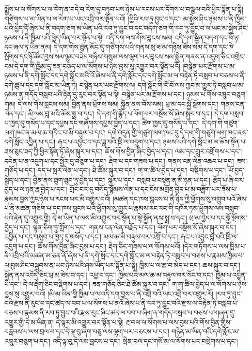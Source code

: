 སྨྱོས་པ་ལ་སོགས་པ་ལ་རེག་ན་བདེ་བ་རེག་དུ་བཏུབ་པས་ཉེས་པ་རངས་པར་དོགས་པ་བསྩལ་བའི་ཕྱིར་སྟོན་པ་སྟེ། གཙིགས་པ་མ་ཡིན་པ་ལ་རེག་པ་ཡང་འབྲི་བར་སྟོན་པའོ། །ཕྱིའི་རབ་ཏུ་བྱུང་བ་དང་། མ་སྐྱེས་ཤིང་ཉམས་པ་ནི་ཁྱིམ་པའི་ཕྱེད་དོ་ཞེས་པ་ནི་བདག་ཅག་མ་ཡིན་པའི་རབ་ཏུ་བྱུང་བ་དང་བདག་ཅག་གི་རབ་ཏུ་བྱུང་བ་ལ་ཡང་མ་སྐྱེས་ཤིང་ཉམས་པ་ནི་ཁྱིམ་པའི་ཕྱེད་ཡིན་བར་སྟོན་པ་སྟེ། འདི་དག་ལས་གོས་བླངས་སམ། འདི་དག་སྦྱིན་བདག་དང་ཕོ་ཉ་དང་ཞལ་ཏ་ཡིན་ནམ། དེ་དག་གིས་ཐུན་མོང་དུ་གཙིགས་པའི་གནས་སུ་ཟ་མ་གཉིས་ཟོས་སམ་དེ་དག་དང་ཁེ་སྤོགས་དང་ཉོ་ཚོང་བྱས་སམ་ལྷུང་བཟེད་གཉིས་གསུམ་ལས་ལྷག་པར་བླངས་སམ་སྨྱེན་གནས་ན་འདུག་ཅིང་འགྲེང་ངམ་དེ་དག་གི་ཁྱིམ་དུ་ཟན་བཅད་པ་ལ་སོགས་པ་ཉེས་བྱས་སུ་འགྱུར་བར་སྟོན་པའོ། །བསྙེན་པར་རྫོགས་པ་མ་ཉམས་པ་ནི་དགེ་སློང་དང་དགེ་སློང་མའི་འོ་ཞེས་པ་ནི་དགེ་སློང་དང་དགེ་སློང་མ་ལ་བརྟེན་ཏེ་བསླབ་པ་བཅས་པ་ནི་དགེ་ཚུལ་དང་དགེ་སློང་མ་ཡིན་ཏེ། བསྙེན་པར་ཡང་རྫོགས་ལ། དགེ་སློང་གི་ངོ་བོ་ལས་ཀྱང་མ་གྱུར་ཏེ་བསླབ་པ་མ་ཉམས་ན་གདོད་བསླབ་པའི་རྟེན་དུ་རུང་བར་སྟོན་པ་སྟེ། བསྙེན་པར་མ་རྫོགས་པ་དང་། ཉམས་པ་གོས་འཁྲུར་བཅུག་གམ། དེ་ལས་གོས་བླངས་སམ། བྱིན་ནས་ཕྲོགས་སམ། སྐྱོན་ནས་བོས་སམ། ཕྲ་མ་དང་སྐྱོ་སྔོགས་དང་། གནས་ངན་ལེན་དང་། མི་ལས་བླ་མའི་ཆོས་སྨྲ་བ་དང་། དེ་དག་གི་རྙེད་པ་ལོག་པར་བསྔོས་སོ་ཞེས་སྐུར་བ་དང་། དེ་དག་བསླབ་པ་ཁྱད་དུ་གསོད་པ་དང་དཔྱས་དང་གཞོགས་དཔྱས་བྱེད་པ་དང་། ཚིག་ཁྱད་དུ་གསོད་པ་དང་། དེ་དག་གི་གཙུག་ལག་ཁང་ན་མལ་ཆ་གདིང་བ་མི་བརྟུལ་བ་དང་། དགེ་འདུན་གྱི་གཙུག་ལག་ཁང་དུ་དེ་དག་གི་གཙུག་ལག་ཁང་ནས་དགེ་སློང་འབྱིན་པ་དང་། རྐང་པ་འབྱུང་བ་དང་ཟླ་བའི་ཁྲི་ལ་འདུག་པ་དང་། ཉམས་པའི་དགེ་སློང་མ་ལ་ཆོས་སྟོན་པ་ཟས་ཅུང་ཟད་ཀྱི་ཕྱིར་སྟོན་ཏོ་ཞེས་སྐུར་པ་དང་། ཆོས་གོས་བྱིན་ཞིང་བྱེད་པ་དང་། ལམ་དང་གྲུར་འགྲོགས་པ་དང་། དབེན་པ་ན་འདུག་པ་དང་སྦྱོར་དུ་བཅུག་པ་དང་། རྡེག་པ་དང་གཟས་པ་དང་། གནས་ངན་ལེན་འཆབ་པ་དང་། ཟས་གཅོད་པ་དང་། དད་པ་སླར་ལེན་པ་དང་། ཐེ་ཚོམ་སྐུར་བ་དང་། ག་ག་ཚིལ་བྱེད་པ་དང་། བསྡིགས་པ་དང་། ཡོ་བྱད་སྦེད་པ་དང་། བྱིན་ནས་ཐུག་ཐུབ་ཏུ་བྱེད་པ་དང་། སྐུར་པ་དང་། བསླབ་པ་བསྟན་ན་མི་ཉན་པ་དང་། རྩོད་པ་ཞི་བར་བྱེད་པ་ལ་ཉན་རྣ་བྱེད་པ་དང་། གྲོང་བར་དུ་བསོད་སྙོམས་ལེན་པ་དང་ངོས་མགྲོན་བྱེད་པ་མ་བཟློག་པར་ཟོས་པ་རྣམས་བྱས་ཀྱང་ཉེས་པ་རངས་པར་མི་འགྱུར་བའོ། །མཚན་དང་ཁས་བླངས་པ་ནི་ཉིད་ཀྱི་ཕྱོགས་སུ་འགྲུབ་པའོ་ཞེས་པ་ནི་མཚན་གཅིག་པ་དང་ཁས་བླངས་པའི་ཕྱོགས་སུ་གྱུར་པ་རྣམས་རང་རང་གི་འཁོར་ཏམ་ཕྱོགས་ལས་བསླབ་པའི་རྟེན་དུ་འགྱུར་གྱི། དེ་མ་ཡིན་པ་ལས་མི་འགྱུར་བར་སྟོན་པ་སྟེ་སྐྱོན་ནས་སྨྲ་བ་དང་། ཕྲ་མ་བྱེད་པ་དང་སྐྱོ་སྔོགས་བྱེད་པ་དང་། ལྷན་ཅིག་ཏུ་ཀློག་པ་དང་། གནས་ངན་ལེན་བརྗོད་པ་དང་། ལོག་པར་བསྔོས་སོ་ཞེས་སྐུར་བ་དང་། འབྱིན་པ་དང་བསླབ་པ་ཁྱད་དུ་གསོད་པ་དང་། མལ་ཆ་མི་བརྟུལ་བར་འགྲོ་བ་དང་། རྐང་པ་འབྱུང་བླ་བའི་ཁྲི་ལ་འདུག་པ་དང་། ཆོས་གོས་བྱིན་ཞིང་བྱས་པ་དང་། རྡེག་ཅིང་གཟས་པ་ལ་སོགས་པའོ། །དེར་གཏོགས་པ་ལས་ཁྱིམ་པ་ནི་འབྲི་བའི་མཚན་མ་ཅན་ནོ་ཞེས་པ་ནི་དགེ་སློང་དང་དགེ་སློང་མ་ལ་བརྟེན་ཏེ་བསླབ་པ་བཅས་པ་རྣམས་ཁྱིམ་པ་ལ་བྱས་ཤིང་བསྒྲུབས་ན་ཡང་ཉེས་པའི་ཤས་ཡོད་པར་སྟོན་པ་སྟེ། ཁྱིམ་པ་ལ་རྩ་བ་མེད་པ་དང་། ཆས་སྐུར་བ་དང་། སྐྱོན་ནས་འབོད་ཅིང་ཕྲ་མ་ཟེར་བ་དང་། འཕྱ་བ་དང་། ཁྱིམ་པའི་མལ་ཆ་མ་བརྟུལ་བར་སོང་བ་དང་། ཁྱིམ་པ་འབྱིན་པ་དང་། དེ་ལ་རྡེག་ཅིང་བསྡིགས་པ་དང་། ཟན་གཅོད་ཅིང་ཐེ་ཚོམ་སྐུར་བ་དང་། ག་ག་ཚིལ་བྱེད་པ་ལ་སོགས་པ་ཉེས་བྱས་སུ་འགྱུར་བའོ། །མི་མ་ཡིན་གྱི་ཁྱིམ་པ་ལ་འདི་དག་བྱས་པ་ནི་འབྲི་བའི་ཡང་འབྲི་བར་འགྱུར་རོ། །རབ་ཏུ་བྱུང་བའི་རྫས་ནི་རུང་བ་དང་ཚད་ལ་བབ་པ་ལ་སོགས་པ་ནའོ་ཞེས་པ་ནི་རབ་ཏུ་བྱུང་བའི་རྫས་ལ་བརྟེན་ཏེ་བསླབ་པ་བཅས་པ་རྣམས་ནི་རབ་ཏུ་བྱུང་བའི་རྫས་རུང་ཞིང་ཚད་ལ་བབ་པ་ཞིག་ན་གདོད་བསླབ་པ་བཅས་པ་གཞན་དུ་འགྱུར་གྱི་དེ་མ་ཡིན་ན། དེ་ལྟར་མི་འགྱུར་བར་སྟོན་པ་སྟེ། རྔ་བལ་ལ་སོགས་པ་ལས་བྱས་པའི་གོས་བྱིན་གྱིས་བརླབས་པ་ལས་བྲལ་བ་དང་དེ་ལྟ་བུ་ཞག་བཅུ་ལས་ལྷག་པར་བཅངས་པ་དང་། གཉེན་མ་ཡིན་བའི་དགེ་སློང་མ་འཁྲུར་བཅུག་པ་དང་། འདི་ལྟ་བུ་དེ་ལས་བླངས་པ་དང་། སྲིན་བལ་དང་གསོ་མ་ལ་སོགས་པར་བསྲེགས་པ་དང་། 